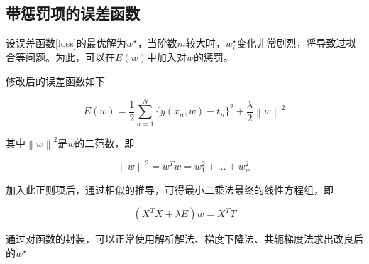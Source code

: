 \subsection{带惩罚项的误差函数}

设误差函数\eqref{loss}的最优解为$w^{\star}$，当阶数$m$较大时，$w_i^{\star}$变化非常剧烈，将导致过拟合等问题。为此，可以在$E(w)$中加入对$w$的惩罚。

修改后的误差函数如下

\begin{equation}
    E(w) = \frac{1}{2} \sum_{n=1}^{N} \{ y(x_n, w) - t_n \}^2 + \frac{\lambda}{2} \left\lVert w \right\rVert ^2
\end{equation}

其中$\left\lVert w \right\rVert ^2$是$w$的二范数，即

\begin{equation}
    \left\lVert w \right\rVert ^2 = w^T w = w_1^2 + \ldots + w_m^2
\end{equation}

加入此正则项后，通过相似的推导，可得最小二乘法最终的线性方程组，即

\begin{equation}
    \left( X^T X + \lambda E \right) w = X^T T    
\end{equation}

通过对函数的封装，可以正常使用解析解法、梯度下降法、共轭梯度法求出改良后的$w^{\star}$
